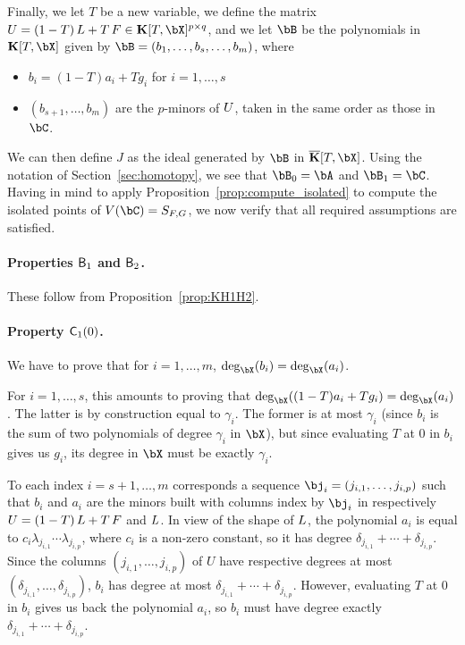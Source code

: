 \documentclass[12pt]{article}
\begin{document}
Finally, we let $T$ be a new variable, we define the matrix
$\mU=(1-T)\, \mL + T \, \mF \in \KK[T,\bX]^{p\times q}$, and we let $\bB$ be the polynomials in
$\KK[T,\bX]$ given by $\bB=(b_1,\dots,b_s,\dots,b_m)$, where
\begin{itemize}
\item $b_i=(1-T) a_i + T g_i$ for $i=1,\dots,s$
\item $(b_{s+1},\dots,b_{m})$ are the $p$-minors of ${U}$, taken in
  the same order as those in $\bC$.
\end{itemize}
We can then define $J$ as the ideal generated by $\bB$ in
$\KKbar[T,\bX]$. Using the notation of Section~\ref{sec:homotopy}, we
see that $\bB_0=\bA$ and $\bB_1=\bC$. Having in mind
to apply Proposition~\ref{prop:compute_isolated} to compute the
isolated points of $V(\bC)=S_{\mF,\mG}$, we now verify that all
required assumptions are satisfied.

\paragraph{Properties $\mathsf{B}_1$ and $\mathsf{B}_2$.}
These follow from Proposition~\ref{prop:KH1H2}.

\paragraph{Property $\mathsf{C}_1(0)$.} We have to prove that for $i=1,\dots,m$,
$\deg_\bX(b_i)=\deg_\bX(a_i)$. 

For $i=1,\dots,s$, this amounts to proving that $\deg_\bX((1-T) a_i +
T g_i)=\deg_\bX(a_i)$. The latter is by construction equal to
$\gamma_i$. The former is at most $\gamma_i$ (since $b_i$ is the sum
of two polynomials of degree $\gamma_i$ in $\bX$), but since
evaluating $T$ at $0$ in $b_i$ gives us $g_i$, its degree in $\bX$
must be exactly $\gamma_i$.

To each index $i=s+1,\dots,m$ corresponds a sequence
$\bj_i=(j_{i,1},\dots,j_{i,p})$ such that $b_i$ and $a_i$ are the
minors built with columns index by $\bj_i$ in respectively
${U}=(1-T)\, {L} + T \, {F}$ and ${L}$. In view of the shape of ${L}$,
the polynomial $a_i$ is equal to $c_i\lambda_{j_{i,1}}\cdots
\lambda_{j_{i,p}}$, where $c_i$ is a non-zero constant, so it has degree
$\delta_{j_{i,1}} + \cdots + \delta_{j_{i,p}}$.  Since the columns
$(j_{i,1},\dots,j_{i,p})$ of $U$ have respective degrees at most
$(\delta_{j_{i,1}},\dots,\delta_{j_{i,p}})$, $b_i$ has degree at most
$\delta_{j_{i,1}} + \cdots + \delta_{j_{i,p}}$. However, evaluating
$T$ at $0$ in $b_i$ gives us back the polynomial $a_i$, so $b_i$ must
have degree exactly $\delta_{j_{i,1}} + \cdots + \delta_{j_{i,p}}$.
\end{document}

